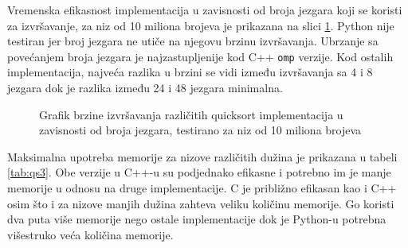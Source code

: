 \documentclass[12pt,oneside]{memoir}
\begin{document}
Vremenska efikasnost implementacija u zavisnosti od broja jezgara koji se koristi za izvršavanje, za niz od 10 miliona brojeva je prikazana na slici \ref{fig:qs1}. Python nije testiran jer broj jezgara ne utiče na njegovu brzinu izvršavanja. Ubrzanje sa povećanjem broja jezgara je najzastupljenije kod C++ \texttt{omp} verzije. Kod ostalih implementacija, najveća razlika u brzini se vidi između izvršavanja sa 4 i 8 jezgara dok je razlika između 24 i 48 jezgara minimalna. 
\\

\begin{figure}
\begin{center}


\caption{Grafik brzine izvršavanja različitih quicksort implementacija u zavisnosti od broja jezgara, testirano za niz od 10 miliona brojeva}
\label{fig:qs1}
\end{center}
\end{figure}

Maksimalna upotreba memorije za nizove različitih dužina je prikazana u tabeli \ref{tab:qs3}. Obe verzije u C++-u su podjednako efikasne i potrebno im je manje memorije u odnosu na druge implementacije. C je približno efikasan kao i C++ osim što i za nizove manjih dužina zahteva veliku količinu memorije. Go koristi dva puta više memorije nego ostale implementacije dok je Python-u potrebna višestruko veća količina memorije.
\\
\end{document}
